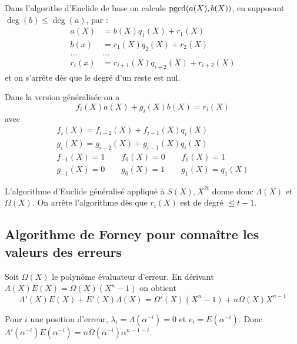 	Dans l'algorithe d'Euclide de base on calcule $\operatorname{pgcd}(a(X),b(X))$, en supposant $\deg(b) \leq \deg(a)$, par :
	\begin{align*}
		a(X) & = b(X) q_1(X) + r_1(X) \\
		b(x) & = r_1(X) q_2(X) + r_2(X) \\
		\hdots & \hdots \\
		r_i(x) & = r_{i + 1}(X) q_{i + 2}(X) + r_{i + 2}(X)
	\end{align*}
	et on s'arrête dès que le degré d'un reste est nul.

	Dans la version généralisée on a
	$$f_i(X)a(X) + g_i(X)b(X) = r_i(X)$$
	avec
	$$\begin{array}{l}
		f_i(X) = f_{i - 2}(X) + f_{i - 1}(X) q_i(X) \\
		g_i(X) = g_{i - 2}(X) + g_{i - 1}(X) q_i(X) \\
		f_{-1}(X) = 1 \qquad f_0(X) = 0 \qquad f_1(X) = 1 \\
		g_{-1}(X) = 0 \qquad g_0(X) = 1 \qquad g_1(X) = q_1(X)
		\end{array}$$

	L'algorithme d'Euclide généralisé appliqué à $S(X), X^{2t}$ donne donc $\Lambda(X)$ et $\Omega(X)$.
	On arrête l'algorithme dès que $r_i(X)$ est de degré $\leq t - 1$.


\subsection{Algorithme de Forney pour connaître les valeurs des erreurs}

	Soit $\Omega(X)$ le polynôme évaluateur d'erreur.
	En dérivant $\Lambda(X)E(X) = \Omega(X)(X^n - 1)$ on obtient
	$$\Lambda'(X)E(X) + E'(X)\Lambda(X) = \Omega'(X)(X^n - 1) + n \Omega(X)X^{n - 1}$$

	Pour $i$ une position d'erreur, $\lambda_i = \Lambda(\alpha^{-i}) = 0$ et $e_i = E(\alpha^{-i})$.
	Donc $\Lambda'(\alpha^{-i}) E(\alpha^{-i}) = n \Omega(\alpha^{-i}) \alpha^{n - 1 - i}$.

